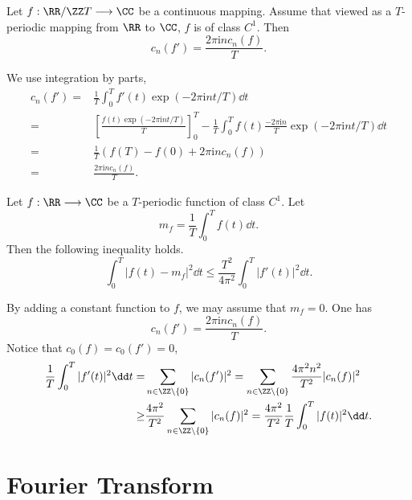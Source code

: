 \begin{propositionenv}
    Let $f : \RR /\ZZ T \longrightarrow \CC$ be a continuous mapping.
    Assume that viewed as a $T$-periodic mapping from $\RR$ to $\CC$, $f$ is of class $C^1$.
    Then
    $$c_n(f') = \frac{2 \pi \mathrm{i} n c_{n}(f)}{T}.$$
\end{propositionenv}
\begin{proofenv}
    We use integration by parts,
    $$\begin{aligned}
        c_n(f') = & \frac{1}{T} \int_{0}^{T} f'(t) \exp(-2 \pi \mathrm{i} n t /T) \dd t\\
        = & \left[\frac{f(t) \exp(-2 \pi \mathrm{i} n t/T)}{T}\right]_{0}^{T} - \frac{1}{T} \int_{0}^{T} f(t) \frac{-2 \pi \mathrm{i} n}{T} \exp(- 2 \pi \mathrm{i} n t/T) \dd t\\
        = & \frac{1}{T} \left(f(T) - f(0) + 2 \pi \mathrm{i} n c_n (f)\right)\\
        = & \frac{2 \pi \mathrm{i} n c_n(f)}{T}.
    \end{aligned}$$
\end{proofenv}

\begin{propositionenv}
    Let $f : \RR \longrightarrow \CC$ be a $T$-periodic function of class $C^1$.
    Let
    $$m_f = \frac{1}{T} \int_{0}^{T} f(t) \dd t.$$
    Then the following inequality holds.
    $$\int_{0}^{T} |f(t) - m_f|^2 \dd t \le \frac{T^2}{4 \pi^2} \int_{0}^{T} |f'(t)|^2 \dd t.$$
\end{propositionenv}
\begin{proofenv}
    By adding a constant function to $f$, we may assume that $m_f = 0$.
    One has
    $$c_n(f') = \frac{2 \pi \mathrm{i} n c_n(f)}{T}.$$
    Notice that $c_0(f) = c_0(f') = 0$,
    $$\begin{aligned}
        \frac{1}{T} \int_{0}^{T} |f'(t)|^2 \dd t = & \sum_{n \in \ZZ \setminus \{0\}} |c_n(f')|^2 = \sum_{n \in \ZZ \setminus \{0\}} \frac{4 \pi^2 n^2}{T^2} |c_n (f)|^2\\
        \ge & \frac{4 \pi^2}{T^2} \sum_{n \in \ZZ \setminus \{0\}} |c_n(f)|^2 = \frac{4 \pi^2}{T^2} \frac{1}{T} \int_{0}^{T} |f(t)|^2 \dd t.
    \end{aligned}$$
\end{proofenv}


\section{Fourier Transform}


